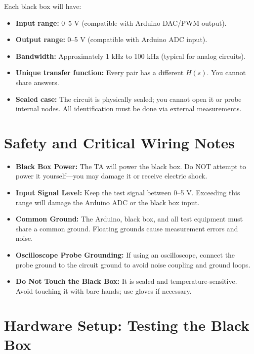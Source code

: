 \documentclass[11pt,letterpaper]{article}
\begin{document}
Each black box will have:
\begin{itemize}
    \item \textbf{Input range:} 0--5 V (compatible with Arduino DAC/PWM output).
    \item \textbf{Output range:} 0--5 V (compatible with Arduino ADC input).
    \item \textbf{Bandwidth:} Approximately 1 kHz to 100 kHz (typical for analog circuits).
    \item \textbf{Unique transfer function:} Every pair has a different $H(s)$. You cannot share answers.
    \item \textbf{Sealed case:} The circuit is physically sealed; you cannot open it or probe internal nodes. All identification must be done via external measurements.
\end{itemize}

\clearpage

\section{Safety and Critical Wiring Notes}

\begin{itemize}
    \item \textbf{Black Box Power:} The TA will power the black box. Do NOT attempt to power it yourself—you may damage it or receive electric shock.
    \item \textbf{Input Signal Level:} Keep the test signal between 0--5 V. Exceeding this range will damage the Arduino ADC or the black box input.
    \item \textbf{Common Ground:} The Arduino, black box, and all test equipment must share a common ground. Floating grounds cause measurement errors and noise.
    \item \textbf{Oscilloscope Probe Grounding:} If using an oscilloscope, connect the probe ground to the circuit ground to avoid noise coupling and ground loops.
    \item \textbf{Do Not Touch the Black Box:} It is sealed and temperature-sensitive. Avoid touching it with bare hands; use gloves if necessary.
\end{itemize}

\clearpage

\section{Hardware Setup: Testing the Black Box}
\end{document}
